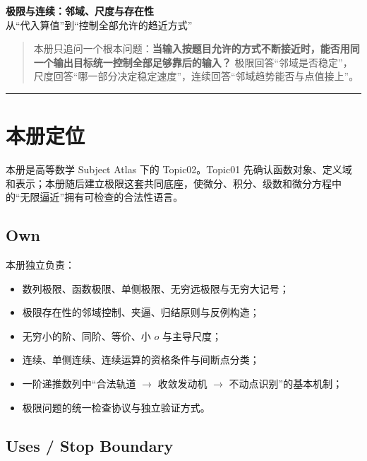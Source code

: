 \documentclass[11pt,a4paper]{ctexart}
\begin{document}
\begin{center}
{\LARGE\textbf{极限与连续：邻域、尺度与存在性}}\\[0.4em]
{\large 从“代入算值”到“控制全部允许的趋近方式”}
\end{center}
\vspace{0.5em}

\begin{quote}
本册只追问一个根本问题：\textbf{当输入按题目允许的方式不断接近时，能否用同一个输出目标统一控制全部足够靠后的输入？} 极限回答“邻域是否稳定”，尺度回答“哪一部分决定稳定速度”，连续回答“邻域趋势能否与点值接上”。
\end{quote}

\begin{center}\rule{0.5\linewidth}{0.5pt}\end{center}

\setcounter{section}{-1}
\section{本册定位}

本册是高等数学 Subject Atlas 下的 Topic02。Topic01 先确认函数对象、定义域和表示；本册随后建立极限这套共同底座，使微分、积分、级数和微分方程中的“无限逼近”拥有可检查的合法性语言。

\subsection{Own}

本册独立负责：
\begin{itemize}
  \item 数列极限、函数极限、单侧极限、无穷远极限与无穷大记号；
  \item 极限存在性的邻域控制、夹逼、归结原则与反例构造；
  \item 无穷小的阶、同阶、等价、小 $o$ 与主导尺度；
  \item 连续、单侧连续、连续运算的资格条件与间断点分类；
  \item 一阶递推数列中“合法轨道 $\to$ 收敛发动机 $\to$ 不动点识别”的基本机制；
  \item 极限问题的统一检查协议与独立验证方式。
\end{itemize}

\subsection{Uses / Stop Boundary}
\end{document}
